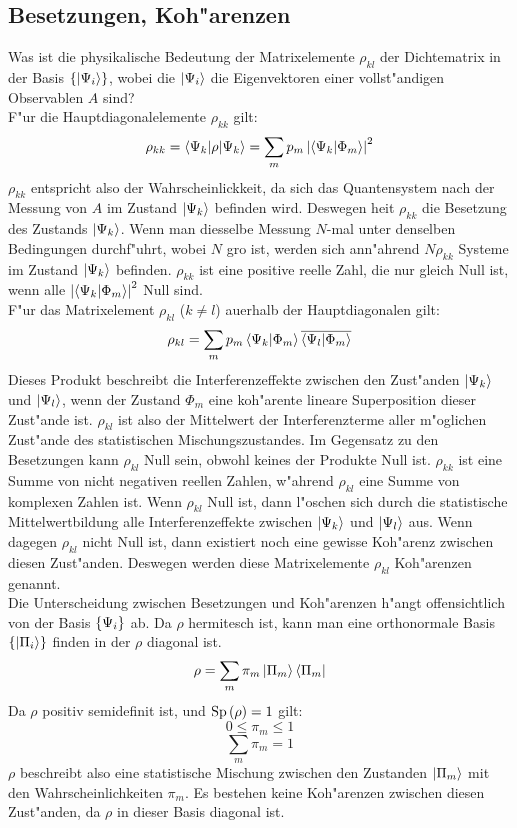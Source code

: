   \subsection{Besetzungen, Koh"arenzen}
    Was ist die physikalische Bedeutung der Matrixelemente $\rho_{kl}$ der Dichtematrix in der Basis $\left\{ \left| \Psi_i \right> \right\}$, wobei die $\left| \Psi_i \right>$ die Eigenvektoren einer
    vollst"andigen Observablen $A$ sind? \\
    F"ur die Hauptdiagonalelemente $\rho_{kk}$ gilt:
    $$ \rho_{kk} = \left< \Psi_k | \rho | \Psi_k \right> = \sum_m p_m \left| \left< \Psi_k | \Phi_m \right> \right|^2 $$
    $\rho_{kk}$ entspricht also der Wahrscheinlickkeit, da\3 sich das Quantensystem nach der Messung von $A$ im Zustand ${\left| \Psi_k \right>}$ befinden wird. Deswegen hei\3t $\rho_{kk}$
    die Besetzung des Zustands $\left| \Psi_k \right>$. Wenn man diesselbe Messung $N$-mal unter denselben Bedingungen durchf"uhrt, wobei $N$ gro\3 ist, werden
    sich ann"ahrend $N\rho_{kk}$ Systeme im Zustand $\left| \Psi_k \right>$ befinden. $\rho_{kk}$ ist eine positive reelle Zahl, die nur gleich Null ist, wenn alle
    $\left| \left< \Psi_k | \Phi_m \right> \right|^2$ Null sind. \\
    F"ur das Matrixelement $\rho_{kl}$ ($k\neq l$) au\3erhalb der Hauptdiagonalen gilt:
    $$ \rho_{kl} = \sum_m p_m \left< \Psi_k | \Phi_m \right>\overline{\left< \Psi_l | \Phi_m \right>} $$
    Dieses Produkt beschreibt die Interferenzeffekte zwischen den Zust"anden $\left| \Psi_k \right>$ und $\left| \Psi_l \right>$, wenn der Zustand $\Phi_m$ eine
    koh"arente lineare Superposition dieser Zust"ande ist. $\rho_{kl}$ ist also der Mittelwert  der Interferenzterme aller m"oglichen 
    Zust"ande des statistischen Mischungszustandes. Im Gegensatz zu den Besetzungen kann $\rho_{kl}$ Null sein, obwohl keines der Produkte Null ist.
    $\rho_{kk}$ ist eine Summe von nicht negativen reellen Zahlen, w"ahrend $\rho_{kl}$ eine Summe von komplexen Zahlen ist. Wenn $\rho_{kl}$ Null ist, dann
    l"oschen sich durch die statistische Mittelwertbildung alle Interferenzeffekte zwischen $\left| \Psi_k \right>$ und $\left| \Psi_l \right>$ aus. Wenn dagegen $\rho_{kl}$
    nicht Null ist, dann existiert noch eine gewisse Koh"arenz zwischen diesen Zust"anden. Deswegen werden diese Matrixelemente $\rho_{kl}$ Koh"arenzen 
    genannt. \\
    Die Unterscheidung zwischen Besetzungen und Koh"arenzen h"angt offensichtlich von der Basis $\left\{ \Psi_i \right\}$ ab. Da $\rho$ hermitesch ist,
    kann man eine orthonormale Basis $\left\{ \left| \Pi_i \right> \right\}$ finden in der $\rho$ diagonal ist.
    $$ \rho = \sum_m \pi_m \left| \Pi_m \right>\left< \Pi_m \right| $$
    Da $\rho$ positiv semidefinit ist, und $\mbox{Sp} \left( \rho\right) = 1$ gilt:
    $$ 0 \le \pi_m \le 1 $$
    $$ \sum_m \pi_m = 1 $$
    $\rho$ beschreibt also eine statistische Mischung zwischen den Zustanden $\left| \Pi_m \right>$ mit den Wahrscheinlichkeiten $\pi_m$. Es bestehen keine
    Koh"arenzen zwischen diesen Zust"anden, da $\rho$ in dieser Basis diagonal ist. 
